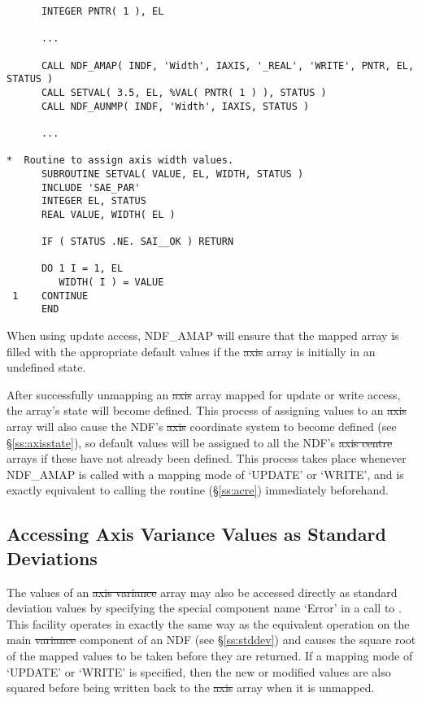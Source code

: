 \small
\begin{verbatim}
      INTEGER PNTR( 1 ), EL

      ...

      CALL NDF_AMAP( INDF, 'Width', IAXIS, '_REAL', 'WRITE', PNTR, EL, STATUS )
      CALL SETVAL( 3.5, EL, %VAL( PNTR( 1 ) ), STATUS )
      CALL NDF_AUNMP( INDF, 'Width', IAXIS, STATUS )

      ...

*  Routine to assign axis width values.
      SUBROUTINE SETVAL( VALUE, EL, WIDTH, STATUS )
      INCLUDE 'SAE_PAR'
      INTEGER EL, STATUS
      REAL VALUE, WIDTH( EL )

      IF ( STATUS .NE. SAI__OK ) RETURN

      DO 1 I = 1, EL
         WIDTH( I ) = VALUE
 1    CONTINUE
      END
\end{verbatim}
\normalsize

When using update access, NDF\_AMAP will ensure that the mapped array is
filled with the appropriate default values if the \st{axis\/} array is
initially in an undefined state. 

After successfully unmapping an \st{axis\/} array mapped for update or
write access, the array's state will become defined. 
This process of assigning values to an \st{axis\/} array will also cause
the NDF's \st{axis\/} coordinate system to become defined (see
\S\ref{ss:axisstate}), so default values will be assigned to all the NDF's
\st{axis centre\/} arrays if these have not already been defined. 
This process takes place whenever NDF\_AMAP is called with a mapping mode of
`UPDATE' or `WRITE', and is exactly equivalent to calling the routine
 (\S\ref{ss:acre}) immediately beforehand. 

\subsection{\label{ss:axisstddev}Accessing Axis Variance Values as Standard Deviations}

The values of an \st{axis variance\/} array may also be accessed directly
as standard deviation values by specifying the special component name
`Error' in a call to . 
This facility operates in exactly the same way as the equivalent operation
on the main \st{variance\/} component of an NDF (see \S\ref{ss:stddev}) and
causes the square root of the mapped values to be taken before they are
returned. 
If a mapping mode of `UPDATE' or `WRITE' is specified, then the new or
modified values are also squared before being written back to the
\st{axis\/} array when it is unmapped.  

